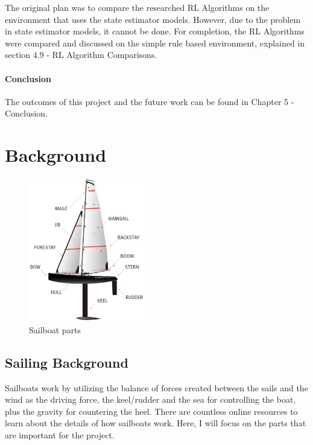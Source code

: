 \documentclass[12pt,twoside]{report}
\begin{document}
The original plan was to compare the researched RL Algorithms on the environment that uses the state estimator models. However, due to the problem in state estimator models, it cannot be done. For completion, the RL Algorithms were compared and discussed on the simple rule based environment, explained in section 4.9 - RL Algorithm Comparisons.

\subsubsection{Conclusion}
The outcomes of this project and the future work can be found in Chapter 5 - Conclusion.
\chapter{Background}

\begin{figure}
\vspace{-11cm}
\centering
\includegraphics[width = 0.45\textwidth]{figures/sailing/sailboat-parts.png}
\caption{Sailboat parts \cite{sail-parts}}
\label{fig:sail-parts}
\end{figure}

\section{Sailing Background}
Sailboats work by utilizing the balance of forces created between the sails and the wind as the driving force, the keel/rudder and the sea for controlling the boat, plus the gravity for countering the heel. There are countless online resources to learn about the details of how sailboats work. Here, I will focus on the parts that are important for the project.
\end{document}
